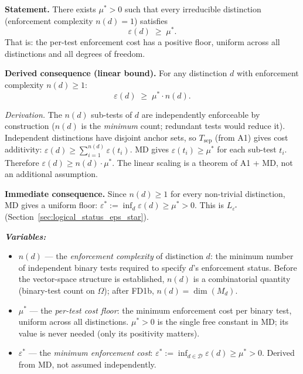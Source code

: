 \documentclass[11pt]{article}
\theoremstyle{remark}
\newenvironment{varlist}{\begin{itemize}[nosep,leftmargin=2em]}{\end{itemize}}
\begin{document}
\begin{tcolorbox}[defbox, title={Assumption MD (Enforcement Isotropy)}]
\label{box:MD_formal}

\textbf{Statement.}
There exists $\mu^* > 0$ such that every irreducible distinction (enforcement complexity $n(d) = 1$) satisfies
\[
\varepsilon(d) \;\ge\; \mu^*.
\]
That is: the per-test enforcement cost has a positive floor, uniform across all distinctions and all degrees of freedom.

\medskip\noindent\textbf{Derived consequence (linear bound).}
For any distinction $d$ with enforcement complexity $n(d) \ge 1$:
\[
\varepsilon(d) \;\ge\; \mu^* \cdot n(d).
\]

\smallskip\noindent\textit{Derivation.}  The $n(d)$ sub-tests of $d$ are independently enforceable by construction ($n(d)$ is the \emph{minimum} count; redundant tests would reduce it).  Independent distinctions have disjoint anchor sets, so $T_{\mathrm{sep}}$ (from A1) gives cost additivity: $\varepsilon(d) \ge \sum_{i=1}^{n(d)} \varepsilon(t_i)$.  MD gives $\varepsilon(t_i) \ge \mu^*$ for each sub-test $t_i$.  Therefore $\varepsilon(d) \ge n(d) \cdot \mu^*$.  The linear scaling is a theorem of A1 + MD, not an additional assumption.

\medskip\noindent\textbf{Immediate consequence.}
Since $n(d) \ge 1$ for every non-trivial distinction, MD gives a uniform floor: $\varepsilon^* := \inf_d \varepsilon(d) \ge \mu^* > 0$.  This is $L_{\varepsilon^*}$ (Section~\ref{sec:logical_status_eps_star}).

\smallskip\noindent\textbf{\textit{Variables:}}
\begin{varlist}
\item $n(d)$ --- the \emph{enforcement complexity} of distinction $d$: the minimum number of independent binary tests required to specify $d$'s enforcement status.  Before the vector-space structure is established, $n(d)$ is a combinatorial quantity (binary-test count on $\Omega$); after FD1b, $n(d) = \dim(M_d)$.
\item $\mu^*$ --- the \emph{per-test cost floor}: the minimum enforcement cost per binary test, uniform across all distinctions.  $\mu^* > 0$ is the single free constant in MD; its value is never needed (only its positivity matters).
\item $\varepsilon^*$ --- the \emph{minimum enforcement cost}: $\varepsilon^* := \inf_{d \in \mathcal{D}} \varepsilon(d) \ge \mu^* > 0$.  Derived from MD, not assumed independently.
\end{varlist}


\end{tcolorbox}
\end{document}
